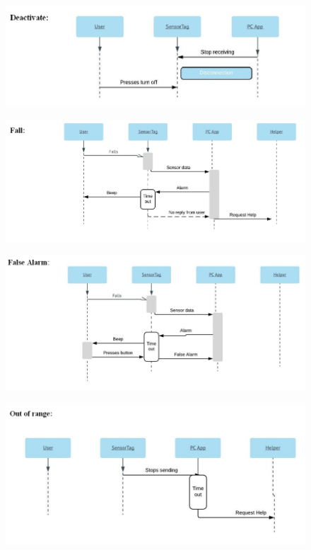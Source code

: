 \documentclass[conference,12pt]{IEEETran}
\begin{document}
\FloatBarrier
\begin{figure}[!h]
	\centering
	\includegraphics[scale=0.4]{images/Seq_Deactivate.png}
	\label{img:deactiv}
\end{figure}
\FloatBarrier

\FloatBarrier
\begin{figure}[!h]
	\centering
	\includegraphics[scale=0.4]{images/Seq_Fall.png}
	\label{img:fall}
\end{figure}
\FloatBarrier

\FloatBarrier
\begin{figure}[!h]
	\centering
	\includegraphics[scale=0.4]{images/Seq_FalseAl.png}
	\label{img:falseal}
\end{figure}
\FloatBarrier

\FloatBarrier
\begin{figure}[!h]
	\centering
	\includegraphics[scale=0.4]{images/Seq_OOR.png}
	\label{img:OOR}
\end{figure}
\FloatBarrier
\end{document}
